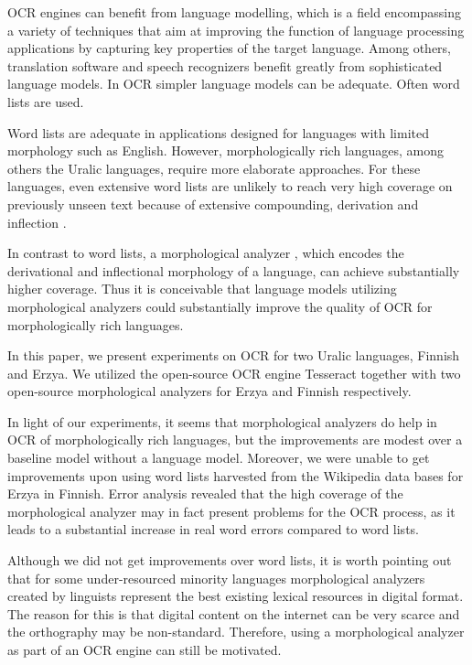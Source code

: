 \documentclass[b5paper]{article}
\begin{document}
OCR engines can benefit from language modelling, which is a field
encompassing a variety of techniques that aim at improving the
function of language processing applications by capturing key
properties of the target language. Among others, translation software
and speech recognizers benefit greatly from sophisticated language
models. In OCR simpler language models can be adequate. Often word
lists are used.

Word lists are adequate in applications designed for languages with
limited morphology such as English. However, morphologically rich
languages, among others the Uralic languages, require more elaborate
approaches. For these languages, even extensive word lists are
unlikely to reach very high coverage on previously unseen text because
of extensive compounding, derivation and inflection \cite{creutz07}.

In contrast to word lists, a morphological analyzer
\cite{koskenniemi83}, which encodes the derivational and inflectional
morphology of a language, can achieve substantially higher
coverage. Thus it is conceivable that language models utilizing
morphological analyzers could substantially improve the quality of OCR
for morphologically rich languages.

In this paper, we present experiments on OCR for two Uralic languages,
Finnish and Erzya. We utilized the open-source OCR engine Tesseract
\cite{smith07} together with two open-source morphological analyzers
for Erzya and Finnish respectively.

In light of our experiments, it seems that morphological analyzers do
help in OCR of morphologically rich languages, but the improvements
are modest over a baseline model without a language model. Moreover,
we were unable to get improvements upon using word lists harvested
from the Wikipedia data bases for Erzya in Finnish. Error analysis
revealed that the high coverage of the morphological analyzer may in
fact present problems for the OCR process, as it leads to a
substantial increase in real word errors compared to word lists.

Although we did not get improvements over word lists, it is worth
pointing out that for some under-resourced minority languages
morphological analyzers created by linguists represent the best
existing lexical resources in digital format. The reason for this is
that digital content on the internet can be very scarce and the
orthography may be non-standard. Therefore, using a morphological
analyzer as part of an OCR engine can still be motivated.
\end{document}
